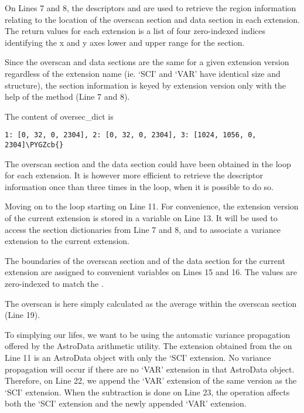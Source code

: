 \documentclass[letterpaper,10pt,english]{sphinxmanual}
\def\PYGZcb{\char`\}}
\begin{document}
On Lines 7 and 8, the descriptors  and 
are used to retrieve the region information relating to the location
of the overscan section and data section in each extension.  The return
values for each extension is a list of four zero-indexed indices identifying
the x and y axes lower and upper range for the section.

Since the overscan and data sections are the same for a given extension
version regardless of the extension name (ie. `SCI' and `VAR' have
identical size and structure), the section information is keyed by extension
version only with the help of the  method (Line 7
and 8).

The content of oversec\_dict is

\begin{Verbatim}[commandchars=\\\{\}]
1: [0, 32, 0, 2304], 2: [0, 32, 0, 2304], 3: [1024, 1056, 0, 2304]\PYGZcb{}
\end{Verbatim}

The overscan section and the data section could have been obtained in the
loop for each extension.  It is however more efficient to retrieve the
descriptor information once than three times in the loop, when it is
possible to do so.

Moving on to the loop starting on Line 11.  For convenience, the extension
version of the current extension is stored in a variable on Line 13.  It
will be used to access the section dictionaries from Line 7 and 8, and to
associate a variance extension to the current extension.

The boundaries of the overscan section and of the data section for the
current extension are assigned to convenient variables on Lines 15 and 16.
The values are zero-indexed to match the .

The overscan is here simply calculated as the average within the overscan
section (Line 19).

To simplying our lifes, we want to be using the automatic variance propagation
offered by the AstroData arithmetic utility.  The extension obtained from the
 on Line 11 is an AstroData object with only the `SCI' extension.  No
variance propagation will occur if there are no `VAR' extension in that
AstroData object.  Therefore, on Line 22, we append the `VAR' extension of the
same version as the `SCI' extension.  When the subtraction is done on Line 23,
the operation affects both the `SCI' extension and the newly appended `VAR'
extension.
\end{document}
